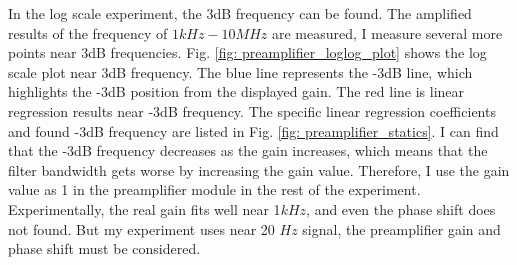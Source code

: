 \documentclass{article}
\begin{document}
  In the log scale experiment, the 3dB frequency can be found.
  The amplified results of the frequency of $1kHz - 10MHz$ are measured, I measure several more points near 3dB frequencies.
  Fig. \ref{fig: preamplifier_loglog_plot} shows the log scale plot near 3dB frequency.
  The blue line represents the -3dB line, which highlights the -3dB position from the displayed gain.
  The red line is linear regression results near -3dB frequency.
  The specific linear regression coefficients and found -3dB frequency are listed in Fig. \ref{fig: preamplifier_statics}.
  I can find that the -3dB frequency decreases as the gain increases, which means that the filter bandwidth gets worse by increasing the gain value.
  Therefore, I use the gain value as 1 in the preamplifier module in the rest of the experiment.
  Experimentally, the real gain fits well near 1$kHz$, and even the phase shift does not found.
  But my experiment uses near 20 $Hz$ signal, the preamplifier gain and phase shift must be considered.
\end{document}
